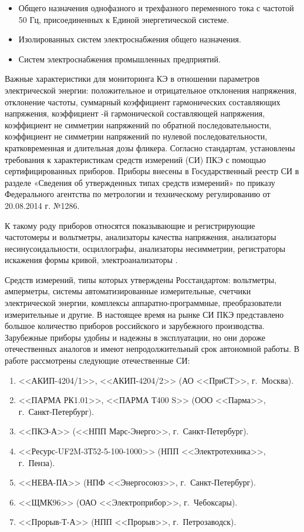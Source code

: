 \begin{itemize}
	\item Общего назначения однофазного и трехфазного переменного тока с частотой 50 Гц, присоединенных к Единой энергетической системе.
	\item Изолированных систем электроснабжения общего назначения.
	\item Систем электроснабжения промышленных предприятий.
\end{itemize}

Важные характеристики для мониторинга КЭ в отношении параметров электрической энергии: положительное и отрицательное отклонения напряжения, отклонение частоты, суммарный коэффициент гармонических составляющих напряжения, коэффициент -й гармонической составляющей напряжения, коэффициент не симметрии напряжений по обратной последовательности, коэффициент не симметрии напряжений по нулевой последовательности, кратковременная и длительная дозы фликера.
Согласно стандартам, установлены требования к характеристикам средств измерений (СИ) ПКЭ с помощью сертифицированных приборов. Приборы внесены в Государственный реестр СИ в разделе «Сведения об утвержденных типах средств измерений» по приказу Федерального агентства по метрологии и техническому регулированию от 20.08.2014 г. №1286.

К такому роду приборов относятся показывающие и регистрирующие частотомеры и вольтметры, анализаторы качества напряжения, анализаторы несинусоидальности, осциллографы, анализаторы несимметрии, регистраторы искажения формы кривой, электроанализаторы \cite{левин1975качество}.

Средств измерений, типы которых утверждены Росстандартом: вольтметры, амперметры, системы автоматизированные измерительные, счетчики электрической энергии, комплексы аппаратно-программные, преобразователи измерительные и другие.
В настоящее время на рынке СИ ПКЭ представлено большое количество приборов российского и зарубежного производства. Зарубежные приборы удобны и надежны в эксплуатации, но они дороже отечественных аналогов и имеют непродолжительный срок автономной работы.
В работе рассмотрены следующие отечественные СИ:
\begin{enumerate}
	\item <<АКИП-4204/1>>, <<АКИП-4204/2>> (АО <<ПриСТ>>, г.~Москва).
	\item <<ПАРМА РК1.01>>, <<ПАРМА Т400 S>> (ООО <<Парма>>, г.~Санкт-Петербург).
	\item <<ПКЭ-А>> (<<НПП Марс-Энерго>>, г.~Санкт-Петербург).
	\item <<Ресурс-UF2M-3Т52-5-100-1000>> (НПП <<Электротехника>>, г.~Пенза).
	\item <<НЕВА-ПА>> (НПФ <<Энергосоюз>>, г.~Санкт-Петербург).
	\item <<ЩМК96>> (ОАО <<Электроприбор>>, г.~Чебоксары).
	\item <<Прорыв-Т-А>> (НПП <<Прорыв>>, г.~Петрозаводск).	
\end{enumerate}

